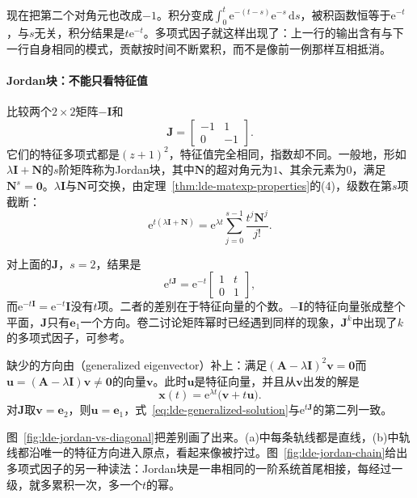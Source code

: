 现在把第二个对角元也改成$-1$。积分变成$\int_0^t\mathrm{e}^{-(t-s)}\mathrm{e}^{-s}\,\mathrm{d}s$，被积函数恒等于$\mathrm{e}^{-t}$，与$s$无关，积分结果是$t\mathrm{e}^{-t}$。多项式因子就这样出现了：上一行的输出含有与下一行自身相同的模式，贡献按时间不断累积，而不是像前一例那样互相抵消。

\paragraph{Jordan块：不能只看特征值}
比较两个$2\times2$矩阵$-\bm{I}$和
\[
 \bm{J}=\begin{bmatrix}-1&1\\0&-1\end{bmatrix}.
\]
它们的特征多项式都是$(z+1)^2$，特征值完全相同，指数却不同。一般地，形如$\lambda\bm{I}+\bm{N}$的$s$阶矩阵称为Jordan块，其中$\bm{N}$的超对角元为$1$、其余元素为$0$，满足$\bm{N}^s=\bm{0}$。$\lambda\bm{I}$与$\bm{N}$可交换，由定理~\ref{thm:lde-matexp-properties}的(4)，级数在第$s$项截断：
\begin{equation}
 \mathrm{e}^{t(\lambda\bm{I}+\bm{N})}=\mathrm{e}^{\lambda t}\sum_{j=0}^{s-1}\frac{t^j\bm{N}^j}{j!}.
 \label{eq:lde-jordan-exponential}
\end{equation}

对上面的$\bm{J}$，$s=2$，结果是
\[
 \mathrm{e}^{t\bm{J}}=\mathrm{e}^{-t}\begin{bmatrix}1&t\\0&1\end{bmatrix},
\]
而$\mathrm{e}^{-t\bm{I}}=\mathrm{e}^{-t}\bm{I}$没有$t$项。二者的差别在于特征向量的个数。$-\bm{I}$的特征向量张成整个平面，$\bm{J}$只有$\bm{e}_1$一个方向。卷二讨论矩阵幂时已经遇到同样的现象，$\bm{J}^k$中出现了$k$的多项式因子，可参考。

缺少的方向由（generalized eigenvector）补上：满足$(\bm{A}-\lambda\bm{I})^2\bm{v}=\bm{0}$而$\bm{u}=(\bm{A}-\lambda\bm{I})\bm{v}\neq\bm{0}$的向量$\bm{v}$。此时$\bm{u}$是特征向量，并且从$\bm{v}$出发的解是
\begin{equation}
 \bm{x}(t)=\mathrm{e}^{\lambda t}\bigl(\bm{v}+t\bm{u}\bigr).
 \label{eq:lde-generalized-solution}
\end{equation}
对$\bm{J}$取$\bm{v}=\bm{e}_2$，则$\bm{u}=\bm{e}_1$，式~\eqref{eq:lde-generalized-solution}与$\mathrm{e}^{t\bm{J}}$的第二列一致。

图~\ref{fig:lde-jordan-vs-diagonal}把差别画了出来。(a)中每条轨线都是直线，(b)中轨线都沿唯一的特征方向进入原点，看起来像被拧过。图~\ref{fig:lde-jordan-chain}给出多项式因子的另一种读法：Jordan块是一串相同的一阶系统首尾相接，每经过一级，就多累积一次，多一个$t$的幂。

